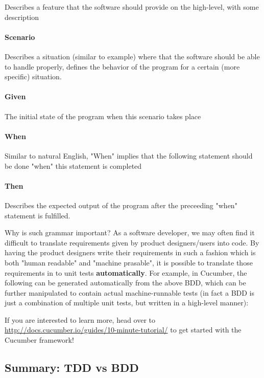 Describes a feature that the software should provide on the high-level, with some description

\paragraph{Scenario}

Describes a situation (similar to example) where that the software should be able to handle properly, defines the behavior of the program for a certain (more specific) situation. 

\paragraph{Given}

The initial state of the program when this scenario takes place

\paragraph{When}

Similar to natural English, "When" implies that the following statement should be done "when" this statement is completed

\paragraph{Then}

Describes the expected output of the program after the preceeding "when" statement is fulfilled. 

Why is such grammar important? As a software developer, we may often find it difficult to translate requirements given by product designers/users into code. By having the product designers write their requirements in such a fashion which is both "human readable" and "machine prasable", it is possible to translate those requirements in to unit tests \textbf{automatically}. For example, in Cucumber, the following can be generated automatically from the above BDD, which can be further manipulated to contain actual machine-runnable tests (in fact a BDD is just a combination of multiple unit tests, but written in a high-level manner):


If you are interested to learn more, head over to \url{http://docs.cucumber.io/guides/10-minute-tutorial/} to get started with the Cucumber framework!

\subsection{Summary: TDD vs BDD}

